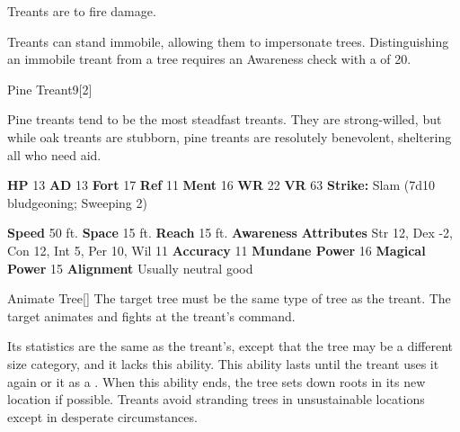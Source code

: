        Treants are  to fire damage.
      
        Treants can stand immobile, allowing them to impersonate trees.
        Distinguishing an immobile treant from a tree requires an Awareness check with a  of 20.
  

  \begin{monsubsection}{Pine Treant}{9}[2]
    \vspace{-1em}\vspace{-1em}
    \vspace{0em}

    
           Pine treants tend to be the most steadfast treants.
           They are strong-willed, but while oak treants are stubborn, pine treants are resolutely benevolent, sheltering all who need aid.
        

    \begin{spellcontent}
      \begin{spelltargetinginfo}
        \pari \textbf{HP} 13 \monsep
          \textbf{AD} 13 \monsep
          \textbf{Fort} 17 \monsep
          \textbf{Ref} 11 \monsep
          \textbf{Ment} 16
        \pari \textbf{WR} 22 \monsep
        \textbf{VR} 63
        \pari \textbf{Strike:}
            Slam  (7d10 bludgeoning; Sweeping 2)
      \end{spelltargetinginfo}
    \end{spellcontent}
    \begin{monsterfooter}
      \pari \textbf{Speed} 50 ft. \monsep
        \textbf{Space} 15 ft. \monsep
        \textbf{Reach} 15 ft.
      \pari \textbf{Awareness} 
      \pari \textbf{Attributes}
        Str 12, Dex -2,
        Con 12, Int 5,
        Per 10, Wil 11
      \pari \textbf{Accuracy} 11 \monsep
        \textbf{Mundane Power} 16 \monsep
      \textbf{Magical Power} 15
      \pari \textbf{Alignment} Usually neutral good
    \end{monsterfooter}
  \end{monsubsection}
  \begin{freeability}{Animate Tree}[]
      The target tree must be the same type of tree as the treant.
        The target animates and fights at the treant's command.

        Its statistics are the same as the treant's, except that the tree may be a different size category, and it lacks this ability.
        This ability lasts until the treant uses it again or  it as a .
        When this ability ends, the tree sets down roots in its new location if possible.
        Treants avoid stranding trees in unsustainable locations except in desperate circumstances.
    \end{freeability}
  
